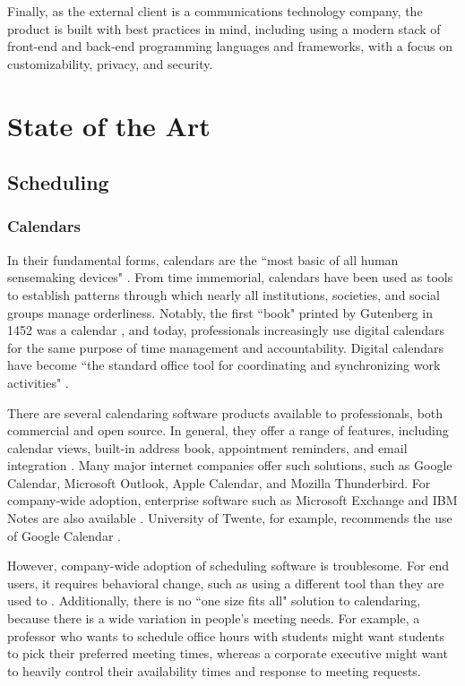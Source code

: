 \documentclass{article}
\begin{document}
Finally, as the external client is a communications technology company, the product is built with best practices in mind, including using a modern stack of front-end and back-end programming languages and frameworks, with a focus on customizability, privacy, and security.

\newpage

\section{State of the Art}

\subsection{Scheduling}

\subsubsection{Calendars}

In their fundamental forms, calendars are the ``most basic of all human sensemaking devices" \cite{wajcman_digital_2019}. From time immemorial, calendars have been used as tools to establish patterns through which nearly all institutions, societies, and social groups manage orderliness. Notably, the first ``book" printed by Gutenberg in 1452 was a calendar \cite{editors_printing_nodate}, and today, professionals increasingly use digital calendars for the same purpose of time management and accountability. Digital calendars have become ``the standard office tool for coordinating and synchronizing work activities" \cite{wajcman_digital_2019}.

There are several calendaring software products available to professionals, both commercial and open source. In general, they offer a range of features, including calendar views, built-in address book, appointment reminders, and email integration \cite{noauthor_top_2019}. Many major internet companies offer such solutions, such as Google Calendar, Microsoft Outlook, Apple Calendar, and Mozilla Thunderbird. For company-wide adoption, enterprise software such as Microsoft Exchange and IBM Notes are also available \cite{masli_design_2011}. University of Twente, for example, recommends the use of Google Calendar \cite{noauthor_home_nodate}.

However, company-wide adoption of scheduling software is troublesome. For end users, it requires behavioral change, such as using a different tool than they are used to \cite{ehrlich_strategies_1987}. Additionally, there is no ``one size fits all" solution to calendaring, because there is a wide variation in people's meeting needs. For example, a professor who wants to schedule office hours with students might want students to pick their preferred meeting times, whereas a corporate executive might want to heavily control their availability times and response to meeting requests.
\end{document}

